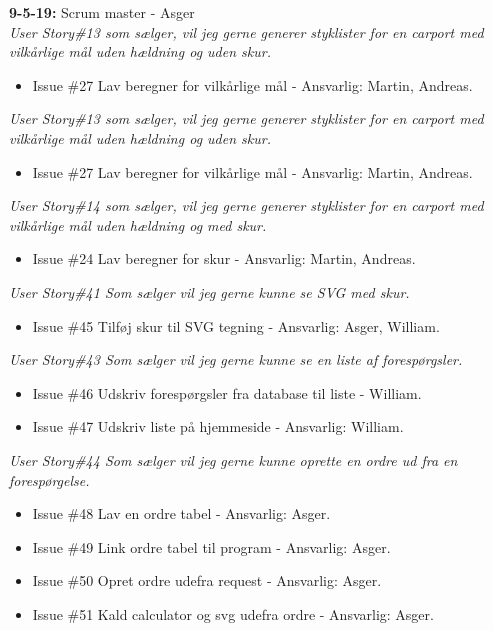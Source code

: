 \documentclass[11pt]{report}
\begin{document}
\noindent\textbf{9-5-19:} Scrum master - Asger\\
\textit{User Story\#13 som sælger, vil jeg gerne generer styklister for en carport med vilkårlige mål uden hældning og uden skur.}
\begin{itemize}
\renewcommand\labelitemi{--}
\item Issue \#27 Lav beregner for vilkårlige mål - Ansvarlig: Martin, Andreas.
\end{itemize}
\textit{User Story\#13 som sælger, vil jeg gerne generer styklister for en carport med vilkårlige mål uden hældning og uden skur.}
\begin{itemize}
\renewcommand\labelitemi{--}
\item Issue \#27 Lav beregner for vilkårlige mål - Ansvarlig: Martin, Andreas.
\end{itemize}
\textit{User Story\#14 som sælger, vil jeg gerne generer styklister for en carport med vilkårlige mål uden hældning og med skur.}
\begin{itemize}
\renewcommand\labelitemi{--}
\item Issue \#24 Lav beregner for skur - Ansvarlig: Martin, Andreas.
\end{itemize}
\textit{User Story\#41 Som sælger vil jeg gerne kunne se SVG med skur.}
\begin{itemize}
\renewcommand\labelitemi{--}
\item Issue \#45 Tilføj skur til SVG tegning - Ansvarlig: Asger, William.
\end{itemize}
\textit{User Story\#43 Som sælger vil jeg gerne kunne se en liste af forespørgsler.}
\begin{itemize}
\renewcommand\labelitemi{--}
\item Issue \#46 Udskriv forespørgsler fra database til liste -
  William.
\item Issue \#47 Udskriv liste på hjemmeside - Ansvarlig: William.
\end{itemize}
\textit{User Story\#44 Som sælger vil jeg gerne kunne oprette en ordre ud fra en forespørgelse.}
\begin{itemize}
\renewcommand\labelitemi{--}
\item Issue \#48  Lav en ordre tabel - Ansvarlig: Asger.
\item Issue \#49 Link ordre tabel til program - Ansvarlig: Asger.
\item Issue \#50 Opret ordre udefra request - Ansvarlig: Asger.
\item Issue \#51 Kald calculator og svg udefra ordre - Ansvarlig: Asger.
\end{itemize}
\end{document}
